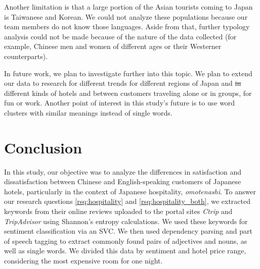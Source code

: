 \documentclass[smallextended,natbib]{svjour3}       %
\providecommand{\DIFadd}[1]{{\protect\color{blue}\uwave{#1}}} %
\providecommand{\DIFdel}[1]{{\protect\color{red}\sout{#1}}}                      %
\providecommand{\DIFaddbegin}{} %
\providecommand{\DIFaddend}{} %
\providecommand{\DIFdelbegin}{} %
\providecommand{\DIFdelend}{} %
\newcommand{\DIFscaledelfig}{0.5}
\newlength{\DIFdelgraphicswidth} %
\newlength{\DIFdelgraphicsheight} %
\newcommand{\DIFaddincludegraphics}[2][]{{\color{blue}\fbox{\DIFOincludegraphics[#1]{#2}}}} %
\newcommand{\DIFdelincludegraphics}[2][]{%
\sbox{\DIFdelgraphicsbox}{\DIFOincludegraphics[#1]{#2}}%
\settoboxwidth{\DIFdelgraphicswidth}{\DIFdelgraphicsbox} %
\settoboxtotalheight{\DIFdelgraphicsheight}{\DIFdelgraphicsbox} %
\scalebox{\DIFscaledelfig}{%
\parbox[b]{\DIFdelgraphicswidth}{\usebox{\DIFdelgraphicsbox}\\[-\baselineskip] \rule{\DIFdelgraphicswidth}{0em}}\llap{\resizebox{\DIFdelgraphicswidth}{\DIFdelgraphicsheight}{%
\setlength{\unitlength}{\DIFdelgraphicswidth}%
\begin{picture}(1,1)%
\thicklines\linethickness{2pt} %
{\color[rgb]{1,0,0}\put(0,0){\framebox(1,1){}}}%
{\color[rgb]{1,0,0}\put(0,0){\line( 1,1){1}}}%
{\color[rgb]{1,0,0}\put(0,1){\line(1,-1){1}}}%
\end{picture}%
}\hspace*{3pt}}} %
} %
\DeclareRobustCommand{\DIFaddbegin}{\DIFOaddbegin \let\includegraphics\DIFaddincludegraphics} %
\DeclareRobustCommand{\DIFaddend}{\DIFOaddend \let\includegraphics\DIFOincludegraphics} %
\DeclareRobustCommand{\DIFdelbegin}{\DIFOdelbegin \let\includegraphics\DIFdelincludegraphics} %
\DeclareRobustCommand{\DIFdelend}{\DIFOaddend \let\includegraphics\DIFOincludegraphics} %
\begin{document}
  Another limitation is that a large portion of the Asian tourists coming to Japan is Taiwanese and Korean. We could not analyze these populations because our team members do not know those languages. Aside from that, further typology analysis could not be made because of the nature of the data collected (for example, Chinese men and women of different ages or their Westerner counterparts).

  In future work, we plan to investigate further into this topic. We plan to extend our data to research for different trends for different regions of Japan and \DIFdelbegin \DIFdel{in }\DIFdelend different kinds of hotels and between customers traveling alone or in groups, for fun or \DIFaddbegin \DIFadd{for }\DIFaddend work. Another point of interest in this study's future is to use word clusters with similar meanings instead of single words. 

\section{Conclusion}\label{conclusion}

  In this study, our objective was to analyze the differences in satisfaction and dissatisfaction between Chinese and English-speaking customers of Japanese hotels, particularly in the context of Japanese hospitality, \textit{omotenashi}. To answer our research questions \ref{rsq:hospitality} and \ref{rsq:hospitality_both}, we extracted keywords from their online reviews uploaded to the portal sites \textit{Ctrip} and \textit{TripAdvisor} using Shannon's entropy calculations. We used these keywords for sentiment classification via an SVC. We then used dependency parsing and part of speech tagging to extract commonly found pairs of adjectives and nouns, as well as single words. We divided this data by sentiment and hotel price range, considering the most expensive room for one night. 
\end{document}
